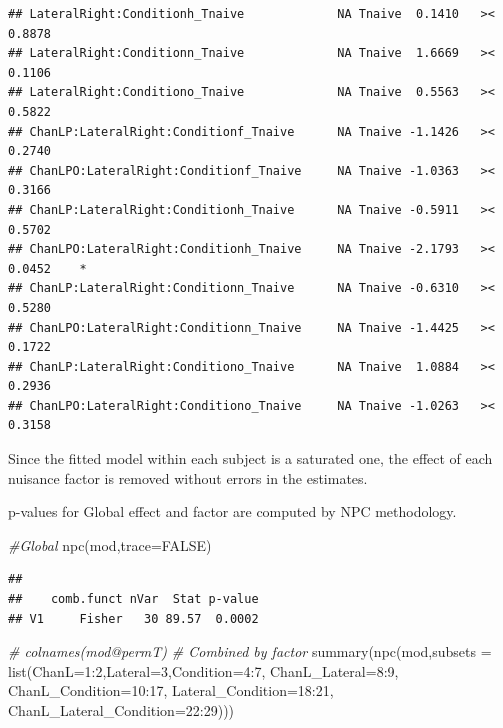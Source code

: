 \documentclass[
]{article}
\newenvironment{Shaded}{\begin{snugshade}}{\end{snugshade}}
\newcommand{\AttributeTok}[1]{\textcolor[rgb]{0.77,0.63,0.00}{#1}}
\newcommand{\CommentTok}[1]{\textcolor[rgb]{0.56,0.35,0.01}{\textit{#1}}}
\newcommand{\ConstantTok}[1]{\textcolor[rgb]{0.00,0.00,0.00}{#1}}
\newcommand{\DecValTok}[1]{\textcolor[rgb]{0.00,0.00,0.81}{#1}}
\newcommand{\FunctionTok}[1]{\textcolor[rgb]{0.00,0.00,0.00}{#1}}
\newcommand{\NormalTok}[1]{#1}
\newcommand{\SpecialCharTok}[1]{\textcolor[rgb]{0.00,0.00,0.00}{#1}}
\begin{document}
\begin{verbatim}
## LateralRight:Conditionh_Tnaive             NA Tnaive  0.1410   ><  0.8878     
## LateralRight:Conditionn_Tnaive             NA Tnaive  1.6669   ><  0.1106     
## LateralRight:Conditiono_Tnaive             NA Tnaive  0.5563   ><  0.5822     
## ChanLP:LateralRight:Conditionf_Tnaive      NA Tnaive -1.1426   ><  0.2740     
## ChanLPO:LateralRight:Conditionf_Tnaive     NA Tnaive -1.0363   ><  0.3166     
## ChanLP:LateralRight:Conditionh_Tnaive      NA Tnaive -0.5911   ><  0.5702     
## ChanLPO:LateralRight:Conditionh_Tnaive     NA Tnaive -2.1793   ><  0.0452    *
## ChanLP:LateralRight:Conditionn_Tnaive      NA Tnaive -0.6310   ><  0.5280     
## ChanLPO:LateralRight:Conditionn_Tnaive     NA Tnaive -1.4425   ><  0.1722     
## ChanLP:LateralRight:Conditiono_Tnaive      NA Tnaive  1.0884   ><  0.2936     
## ChanLPO:LateralRight:Conditiono_Tnaive     NA Tnaive -1.0263   ><  0.3158
\end{verbatim}

Since the fitted model within each subject is a saturated one, the
effect of each nuisance factor is removed without errors in the
estimates.

p-values for Global effect and factor are computed by NPC methodology.

\begin{Shaded}
\begin{Highlighting}[]
\CommentTok{\#Global}
\FunctionTok{npc}\NormalTok{(mod,}\AttributeTok{trace=}\ConstantTok{FALSE}\NormalTok{)}
\end{Highlighting}
\end{Shaded}

\begin{verbatim}
## 
##    comb.funct nVar  Stat p-value
## V1     Fisher   30 89.57  0.0002
\end{verbatim}

\begin{Shaded}
\begin{Highlighting}[]
\CommentTok{\# colnames(mod@permT)}
\CommentTok{\# Combined by factor}
\FunctionTok{summary}\NormalTok{(}\FunctionTok{npc}\NormalTok{(mod,}\AttributeTok{subsets =} \FunctionTok{list}\NormalTok{(}\AttributeTok{ChanL=}\DecValTok{1}\SpecialCharTok{:}\DecValTok{2}\NormalTok{,}\AttributeTok{Lateral=}\DecValTok{3}\NormalTok{,}\AttributeTok{Condition=}\DecValTok{4}\SpecialCharTok{:}\DecValTok{7}\NormalTok{,}
                       \AttributeTok{ChanL\_Lateral=}\DecValTok{8}\SpecialCharTok{:}\DecValTok{9}\NormalTok{,}
                       \AttributeTok{ChanL\_Condition=}\DecValTok{10}\SpecialCharTok{:}\DecValTok{17}\NormalTok{,}
                       \AttributeTok{Lateral\_Condition=}\DecValTok{18}\SpecialCharTok{:}\DecValTok{21}\NormalTok{,}
                       \AttributeTok{ChanL\_Lateral\_Condition=}\DecValTok{22}\SpecialCharTok{:}\DecValTok{29}\NormalTok{)))}
\end{Highlighting}
\end{Shaded}
\end{document}
